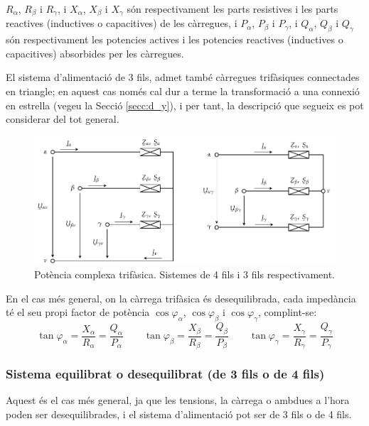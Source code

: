 $R_\alpha$, $R_\beta$ i $R_\gamma$, i $X_\alpha$, $X_\beta$ i
$X_\gamma$ s\'{o}n respectivament les parts resistives i les parts
reactives (inductives o capacitives) de les c\`{a}rregues, i $P_\alpha$,
$P_\beta$ i $P_\gamma$, i $Q_\alpha$, $Q_\beta$ i $Q_\gamma$ s\'{o}n
respectivament les potencies actives i les potencies reactives
(inductives o capacitives) absorbides per les c\`{a}rregues.

El sistema d'alimentaci\'{o} de 3 fils, admet tamb\'{e} c\`{a}rregues
trif\`{a}siques connectades en triangle; en aquest cas nom\'{e}s cal dur a
terme la transformaci\'{o} a una connexi\'{o} en estrella (vegeu la Secci\'{o}
\ref{secc:d_y}), i per tant, la descripci\'{o} que segueix es pot
considerar del tot general.

\begin{figure}[h]
\centering
    \includegraphics{Imatges/Cap-Fonaments-Potencia-Trif.pdf}
\caption{Pot\`{e}ncia complexa trif\`{a}sica. Sistemes de 4 fils i 3 fils
respectivament.} \label{pic:pot_comp_trif}
\end{figure}

En el cas m\'{e}s general, on la c\`{a}rrega trif\`{a}sica \'{e}s desequilibrada,
cada imped\`{a}ncia t\'{e} el seu propi factor de pot\`{e}ncia
$\cos\varphi_\alpha$, $\cos\varphi_\beta$ i $\cos\varphi_\gamma$,
complint-se:
\begin{equation}
    \tan\varphi_\alpha = \frac{X_\alpha}{R_\alpha} = \frac{Q_\alpha}{P_\alpha} \qquad
    \tan\varphi_\beta = \frac{X_\beta}{R_\beta} = \frac{Q_\beta}{P_\beta} \qquad
    \tan\varphi_\gamma = \frac{X_\gamma}{R_\gamma} = \frac{Q_\gamma}{P_\gamma}
\end{equation}

\subsubsection{Sistema equilibrat o desequilibrat (de 3 fils o de 4 fils)}

Aquest \'{e}s el cas m\'{e}s general, ja que les tensions, la c\`{a}rrega o
ambdues a l'hora  poden ser desequilibrades, i el sistema
d'alimentaci\'{o} pot ser de 3 fils o de 4 fils.

